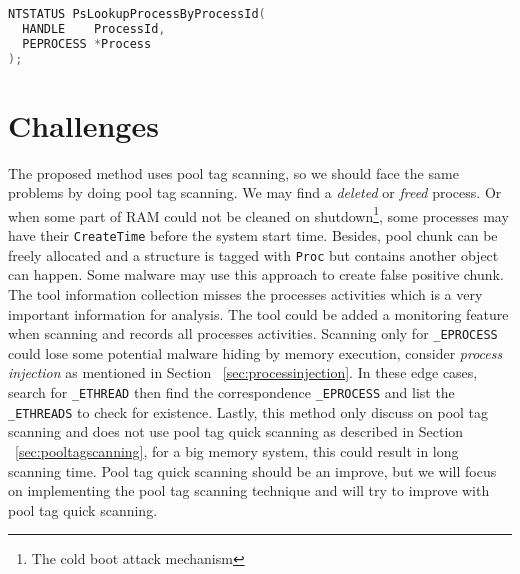 \begin{lstlisting}[language=c,caption={PsLookupProcessByProcessId},label={lst:pslook}]
NTSTATUS PsLookupProcessByProcessId(
  HANDLE    ProcessId,
  PEPROCESS *Process
);
\end{lstlisting}

\section[Challenges]{Challenges}

The proposed method uses pool tag scanning, so we should face the same problems by doing pool tag scanning. We may find a \textit{deleted} or \textit{freed} process. Or when some part of RAM could not be cleaned on shutdown\footnote{The cold boot attack mechanism}, some processes may have their \texttt{CreateTime} before the system start time. Besides, pool chunk can be freely allocated and a structure is tagged with \texttt{Proc} but contains another object can happen. Some malware may use this approach to create false positive chunk. The tool information collection misses the processes activities which is a very important information for analysis. The tool could be added a monitoring feature when scanning and records all processes activities. Scanning only for \texttt{\_EPROCESS} could lose some potential malware hiding by memory execution, consider \textit{process injection} as mentioned in Section ~\ref{sec:processinjection}. In these edge cases, search for \texttt{\_ETHREAD} then find the correspondence \texttt{\_EPROCESS} and list the \texttt{\_ETHREADS} to check for existence. Lastly, this method only discuss on pool tag scanning and does not use pool tag quick scanning as described in Section ~\ref{sec:pooltagscanning}, for a big memory system, this could result in long scanning time. Pool tag quick scanning should be an improve, but we will focus on implementing the pool tag scanning technique and will try to improve with pool tag quick scanning.
